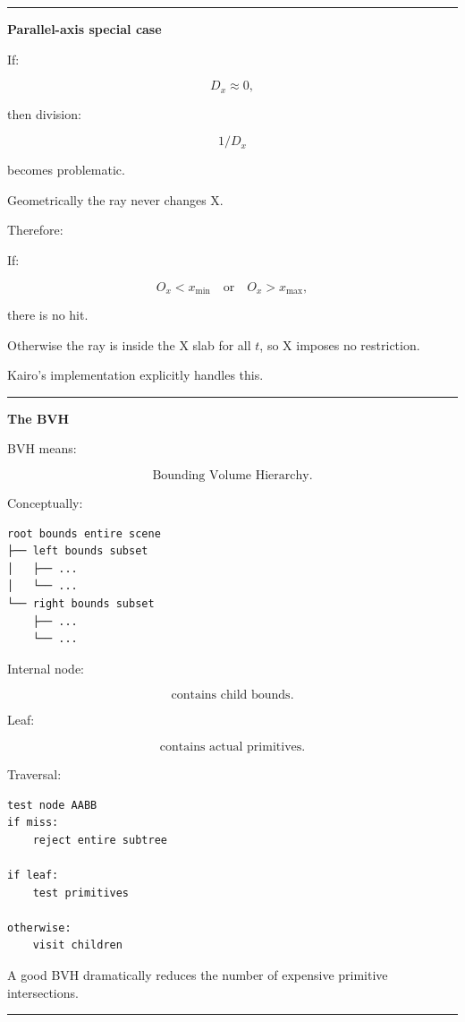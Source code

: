 \begin{center}\rule{0.5\linewidth}{0.5pt}\end{center}

\textbf{Parallel-axis special case}

If:

\[
D_x\approx0,
\]

then division:

\[
1/D_x
\]

becomes problematic.

Geometrically the ray never changes X.

Therefore:

If:

\[
O_x<x_{\min}
\quad\text{or}\quad
O_x>x_{\max},
\]

there is no hit.

Otherwise the ray is inside the X slab for all \(t\), so X imposes no restriction.

Kairo's implementation explicitly handles this.

\begin{center}\rule{0.5\linewidth}{0.5pt}\end{center}

\textbf{The BVH}

BVH means:

\[
\boxed{\text{Bounding Volume Hierarchy}.}
\]

Conceptually:

\begin{verbatim}
root bounds entire scene
├── left bounds subset
│   ├── ...
│   └── ...
└── right bounds subset
    ├── ...
    └── ...
\end{verbatim}

Internal node:

\[
\text{contains child bounds}.
\]

Leaf:

\[
\text{contains actual primitives}.
\]

Traversal:

\begin{verbatim}
test node AABB
if miss:
    reject entire subtree

if leaf:
    test primitives

otherwise:
    visit children
\end{verbatim}

A good BVH dramatically reduces the number of expensive primitive intersections.

\begin{center}\rule{0.5\linewidth}{0.5pt}\end{center}

